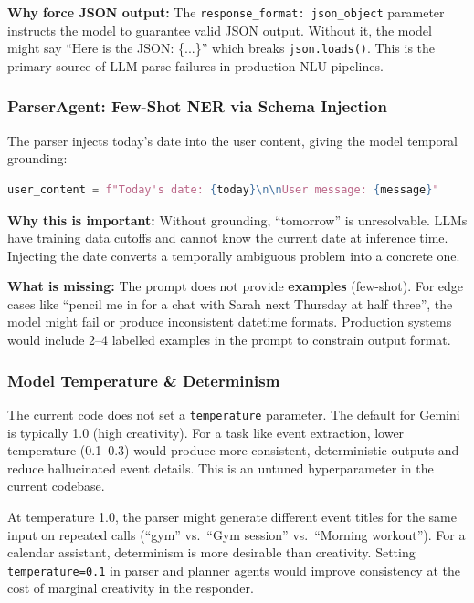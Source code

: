 \documentclass[12pt, a4paper]{article}
\begin{document}
\textbf{Why force JSON output:} The \texttt{response\_format: json\_object} parameter instructs the model to guarantee valid JSON output. Without it, the model might say ``Here is the JSON: \{...\}'' which breaks \texttt{json.loads()}. This is the primary source of LLM parse failures in production NLU pipelines.

\subsubsection{ParserAgent: Few-Shot NER via Schema Injection}

The parser injects today's date into the user content, giving the model temporal grounding:

\begin{lstlisting}[language=Python, caption={Date injection prevents temporal ambiguity}]
user_content = f"Today's date: {today}\n\nUser message: {message}"
\end{lstlisting}

\textbf{Why this is important:} Without grounding, ``tomorrow'' is unresolvable. LLMs have training data cutoffs and cannot know the current date at inference time. Injecting the date converts a temporally ambiguous problem into a concrete one.

\textbf{What is missing:} The prompt does not provide \textbf{examples} (few-shot). For edge cases like ``pencil me in for a chat with Sarah next Thursday at half three'', the model might fail or produce inconsistent datetime formats. Production systems would include 2--4 labelled examples in the prompt to constrain output format.

\subsubsection{Model Temperature \& Determinism}

The current code does not set a \texttt{temperature} parameter. The default for Gemini is typically 1.0 (high creativity). For a task like event extraction, lower temperature (0.1--0.3) would produce more consistent, deterministic outputs and reduce hallucinated event details. This is an untuned hyperparameter in the current codebase.

\begin{warnbox}
  At temperature 1.0, the parser might generate different event titles for the same input on repeated calls (``gym'' vs.\ ``Gym session'' vs.\ ``Morning workout''). For a calendar assistant, determinism is more desirable than creativity. Setting \texttt{temperature=0.1} in parser and planner agents would improve consistency at the cost of marginal creativity in the responder.
\end{warnbox}
\end{document}
